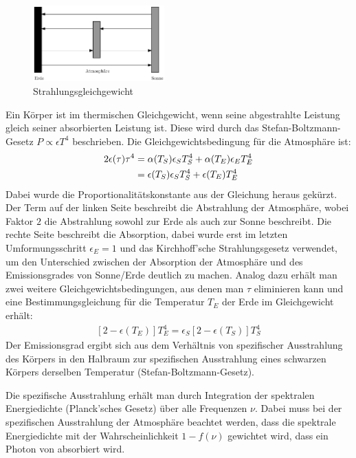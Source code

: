 \documentclass[10pt,a4paper]{article}
\begin{document}
\begin{figure}
\centering
\includegraphics[width=0.45\textwidth]{./figures/strahlungsgleichgewicht.eps}
\caption{Strahlungsgleichgewicht}
\label{fig:strahlungsgleichgewicht}
\end{figure}
Ein Körper ist im thermischen Gleichgewicht, wenn seine abgestrahlte Leistung
gleich seiner absorbierten Leistung ist. Diese wird durch das Stefan-Boltzmann-Gesetz
$P \propto \epsilon T^4$ beschrieben. Die Gleichgewichtsbedingung für die Atmosphäre ist:
\begin{align}
	2\epsilon(\tau)\tau^4 &= \alpha(T_S) \epsilon_S T_S^4 + \alpha(T_E) \epsilon_E T_E^4 \notag \\ &=\epsilon(T_S) \epsilon_S T_S^4 + \epsilon(T_E) T_E^4
\end{align}
Dabei wurde die Proportionalitätskonstante aus der Gleichung heraus gekürzt.
Der Term auf der linken Seite beschreibt die Abstrahlung der Atmosphäre, wobei
Faktor $2$ die Abstrahlung sowohl zur Erde als auch zur Sonne beschreibt.
Die rechte Seite beschreibt die Absorption, dabei wurde erst im letzten
Umformungsschritt $\epsilon_E = 1$ und das Kirchhoff'sche Strahlungsgesetz verwendet,
um den Unterschied zwischen der Absorption der Atmosphäre und des Emissionsgrades von
Sonne/Erde deutlich zu machen.
Analog dazu erhält man zwei weitere Gleichgewichtsbedingungen, aus denen man
$\tau$ eliminieren kann und eine Bestimmungsgleichung für die Temperatur $T_E$
der Erde im Gleichgewicht erhält:
\begin{align}
\left[2-\epsilon(T_E)\right]T_E^4=\epsilon_S\left[2-\epsilon(T_S)\right]T_S^4
\label{eqn:gleichgewicht}
\end{align}
Der Emissionsgrad ergibt sich aus dem Verhältnis von spezifischer Ausstrahlung des Körpers in den Halbraum zur spezifischen Ausstrahlung eines schwarzen Körpers derselben Temperatur (Stefan-Boltzmann-Gesetz). 

Die spezifische Ausstrahlung erhält man durch Integration der spektralen Energiedichte (Planck'sches Gesetz) über alle Frequenzen $\nu$. Dabei muss bei der spezifischen Ausstrahlung der Atmosphäre beachtet werden, dass die spektrale Energiedichte mit der Wahrscheinlichkeit  $1-f(\nu)$ gewichtet wird, dass ein Photon von  absorbiert wird.
\end{document}
